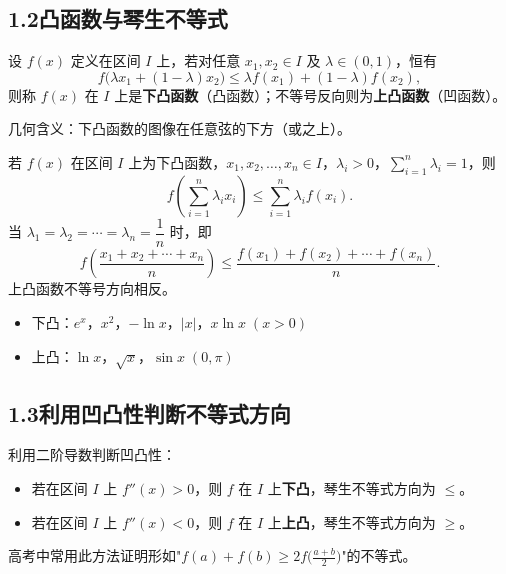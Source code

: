\documentclass[12pt, a4paper]{ctexart}
\begin{document}
\subsection*{1.2\quad 凸函数与琴生不等式}

\begin{knowledgebox}[凸函数的定义]
设 $f(x)$ 定义在区间 $I$ 上，若对任意 $x_1,x_2\in I$ 及 $\lambda\in(0,1)$，恒有
\[
f\bigl(\lambda x_1+(1-\lambda)x_2\bigr)\leq \lambda f(x_1)+(1-\lambda)f(x_2),
\]
则称 $f(x)$ 在 $I$ 上是\textbf{下凸函数}（凸函数）；不等号反向则为\textbf{上凸函数}（凹函数）。\par
几何含义：下凸函数的图像在任意弦的下方（或之上）。
\end{knowledgebox}

\begin{knowledgebox}
若 $f(x)$ 在区间 $I$ 上为下凸函数，$x_1,x_2,\dots,x_n\in I$，$\lambda_i>0$，$\sum_{i=1}^{n}\lambda_i=1$，则
\[
f\!\left(\sum_{i=1}^{n}\lambda_i x_i\right)\leq \sum_{i=1}^{n}\lambda_i f(x_i).
\]
当 $\lambda_1=\lambda_2=\cdots=\lambda_n=\dfrac{1}{n}$ 时，即
\[
f\!\left(\frac{x_1+x_2+\cdots+x_n}{n}\right)\leq \frac{f(x_1)+f(x_2)+\cdots+f(x_n)}{n}.
\]
上凸函数不等号方向相反。
\end{knowledgebox}

\begin{tipbox}
\begin{itemize}[leftmargin=1.5em]
  \item 下凸：$e^x$，$x^2$，$-\ln x$，$|x|$，$x\ln x\;(x>0)$
  \item 上凸：$\ln x$，$\sqrt{x}$，$\sin x\;(0,\pi)$
\end{itemize}
\end{tipbox}

\subsection*{1.3\quad 利用凹凸性判断不等式方向}

\begin{knowledgebox}[核心原理]
利用二阶导数判断凹凸性：\par
\begin{itemize}[leftmargin=1.5em]
  \item 若在区间 $I$ 上 $f''(x)>0$，则 $f$ 在 $I$ 上\textbf{下凸}，琴生不等式方向为 $\leq$。
  \item 若在区间 $I$ 上 $f''(x)<0$，则 $f$ 在 $I$ 上\textbf{上凸}，琴生不等式方向为 $\geq$。
\end{itemize}
高考中常用此方法证明形如"$f(a)+f(b)\geq 2f\!\bigl(\frac{a+b}{2}\bigr)$"的不等式。
\end{knowledgebox}
\end{document}
